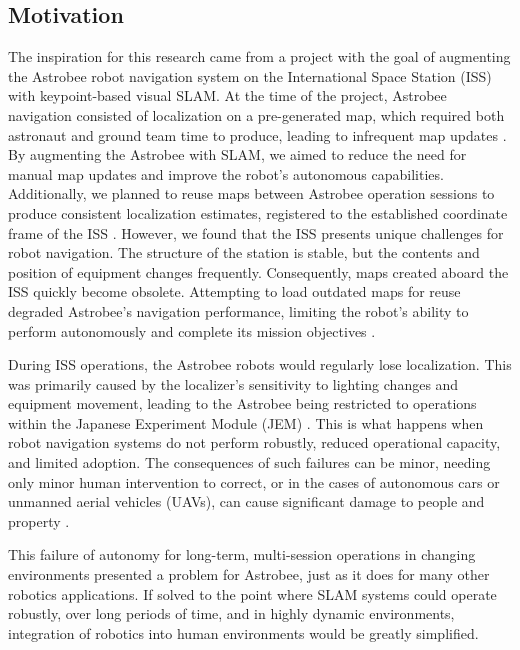 \subsection{Motivation}


The inspiration for this research came from a project with the goal of augmenting the Astrobee robot navigation system on the International Space Station (ISS) with keypoint-based visual SLAM. At the time of the project, Astrobee navigation consisted of localization on a pre-generated map, which required both astronaut and ground team time to produce, leading to infrequent map updates \cite{soussanAstroLocEfficientRobust2022}. By augmenting the Astrobee with SLAM, we aimed to reduce the need for manual map updates and improve the robot's autonomous capabilities. Additionally, we planned to reuse maps between Astrobee operation sessions to produce consistent localization estimates, registered to the established coordinate frame of the ISS \cite{zuralesCollaborativeSensingMapping2024}. However, we found that the ISS presents unique challenges for robot navigation. The structure of the station is stable, but the contents and position of equipment changes frequently. Consequently, maps created aboard the ISS quickly become obsolete. Attempting to load outdated maps for reuse degraded Astrobee's navigation performance, limiting the robot's ability to perform autonomously and complete its mission objectives \cite{carlinoLessonsLearnedAstrobee}.


During ISS operations, the Astrobee robots would regularly lose localization. This was primarily caused by the localizer's sensitivity to lighting changes and equipment movement, leading to the Astrobee being restricted to operations within the Japanese Experiment Module (JEM) \cite{carlinoLessonsLearnedAstrobee}. This is what happens when robot navigation systems do not perform robustly, reduced operational capacity, and limited adoption. The consequences of such failures can be minor, needing only minor human intervention to correct, or in the cases of autonomous cars or unmanned aerial vehicles (UAVs), can cause significant damage to people and property \cite{nahavandiComprehensiveReviewAutonomous2025a}.


This failure of autonomy for long-term, multi-session operations in changing environments presented a problem for Astrobee, just as it does for many other robotics applications. If solved to the point where SLAM systems could operate robustly, over long periods of time, and in highly dynamic environments, integration of robotics into human environments would be greatly simplified.